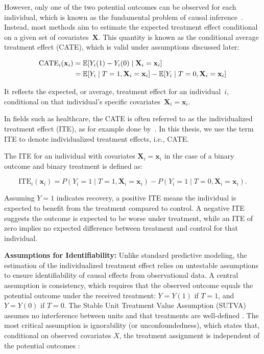 However, only one of the two potential outcomes can be observed for each individual, which is known as the fundamental problem of causal inference~\citep{holland1986}. Instead, most methods aim to estimate the expected treatment effect conditional on a given set of covariates~$\mathbf{X}$. This quantity is known as the conditional average treatment effect (CATE), which is valid under assumptions discussed later:


\begin{align}
\text{CATE}_i(\mathbf{x}_i) &= \mathbb{E}[Y_i(1) - Y_i(0) \mid \mathbf{X}_i = \mathbf{x}_i] \notag \\
                 &= \mathbb{E}[Y_i \mid T = 1, \mathbf{X}_i = \mathbf{x}_i] - \mathbb{E}[Y_i \mid T = 0, \mathbf{X}_i = \mathbf{x}_i]
\end{align}


It reflects the expected, or average, treatment effect for an individual~$i$, conditional on that individual's specific covariates~$\mathbf{X}_i = \mathbf{x}_i$.

In fields such as healthcare, the CATE is often referred to as the individualized treatment effect (ITE), as for example done by~\citet{hoogland2021}. In this thesis, we use the term ITE to denote individualized treatment effects, i.e., CATE.

The ITE for an individual with covariates $\mathbf{X}_i = \mathbf{x}_i$ in the case of a binary outcome and binary treatment is defined as:

\begin{equation}
\text{ITE}_i(\mathbf{x}_i) = P(Y_i = 1 \mid T = 1, \mathbf{X}_i = \mathbf{x}_i) - P(Y_i = 1 \mid T = 0, \mathbf{X}_i = \mathbf{x}_i).
\end{equation}

Assuming $Y = 1$ indicates recovery, a positive ITE means the individual is expected to benefit from the treatment compared to control. A negative ITE suggests the outcome is expected to be worse under treatment, while an ITE of zero implies no expected difference between treatment and control for that individual.

\medskip

\textbf{Assumptions for Identifiability:} Unlike standard predictive modeling, the estimation of the individualized treatment effect relies on untestable assumptions to ensure identifiability of causal effects from observational data. A central assumption is consistency, which requires that the observed outcome equals the potential outcome under the received treatment: $Y = Y(1)$ if $T = 1$, and $Y = Y(0)$ if $T = 0$. The Stable Unit Treatment Value Assumption (SUTVA) assumes no interference between units and that treatments are well-defined \citep{rubin1980}. The most critical assumption is ignorability (or unconfoundedness), which states that, conditional on observed covariates $X$, the treatment assignment is independent of the potential outcomes \citep{rosenbaum1983}:

